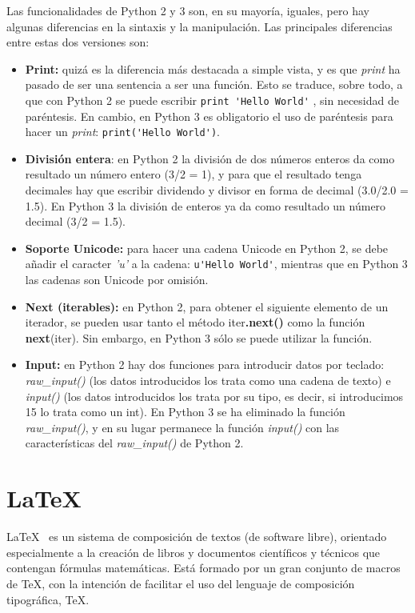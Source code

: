 \documentclass[a4paper, 12pt]{book}
\begin{document}
Las funcionalidades de Python 2 y 3 son, en su mayoría, iguales, pero hay algunas diferencias en la sintaxis y la manipulación. Las principales diferencias entre estas dos versiones son:
\begin{itemize}
	\item \textbf{Print:} quizá es la diferencia más destacada a simple vista, y es que \textit{print} ha pasado de ser una sentencia a ser una función. Esto se traduce, sobre todo, a que con Python 2 se puede escribir \verb"print 'Hello World'" , sin necesidad de paréntesis. En cambio, en Python 3 es obligatorio el uso de paréntesis para hacer un \textit{print}: \verb"print('Hello World')".
	\item \textbf{División entera}: en Python 2 la división de dos números enteros da como resultado un número entero (3/2 = 1), y para que el resultado tenga decimales hay que escribir dividendo y divisor en forma de decimal (3.0/2.0 = 1.5). En Python 3 la división de enteros ya da como resultado un número decimal (3/2 = 1.5).
	\item \textbf{Soporte Unicode:} para hacer una cadena Unicode en Python 2, se debe añadir el caracter \textit{'u'} a la cadena: \verb"u'Hello World'", mientras que en Python 3 las cadenas son Unicode por omisión.
	\item \textbf{Next (iterables):} en Python 2, para obtener el siguiente elemento de un iterador, se pueden usar tanto el método iter\textbf{.next()} como la función \textbf{next}(iter). Sin embargo, en Python 3 sólo se puede utilizar la función.
	\item \textbf{Input:} en Python 2 hay dos funciones para introducir datos por teclado: \textit{raw\_input()} (los datos introducidos los trata como una cadena de texto) e \textit{input()} (los datos introducidos los trata por su tipo, es decir, si introducimos 15 lo trata como un int). En Python 3 se ha eliminado la función \textit{raw\_input()}, y en su lugar permanece la función \textit{input()} con las características del \textit{raw\_input()} de Python 2.
\end{itemize}



\section{\LaTeX}
\label{sec:latex}
\LaTeX~\cite{latex:1} es un sistema de composición de textos (de software libre), orientado especialmente a la creación de libros y documentos científicos y técnicos que contengan fórmulas matemáticas. Está formado por un gran conjunto de macros de \TeX, con la intención de facilitar el uso del lenguaje de composición tipográfica, \TeX.\\
\end{document}
